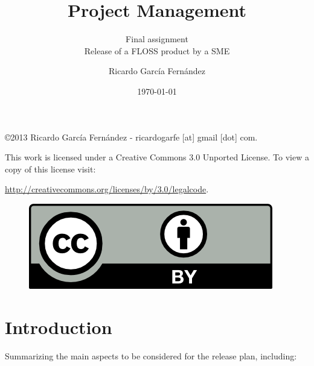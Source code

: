 \documentclass[11pt]{scrartcl}
\title{\textbf{Project Management}}
\subtitle{Final assignment\\
            Release of a FLOSS product by a SME}
\author{Ricardo Garc\'ia Fern\'andez}
\date{\today}
\begin{document}
\maketitle

\vfill

\begin{flushright}
    \copyright  2013 Ricardo Garc\'ia Fern\'andez - ricardogarfe [at] gmail [dot] com.

    This work is licensed under a Creative Commons 3.0 Unported License.
    To view a copy of this license visit:
 
    \url{http://creativecommons.org/licenses/by/3.0/legalcode}.
\end{flushright}

\begin{figure}[h]
    \begin{flushright}	
        \includegraphics{by}
        \label{fig:by}
    \end{flushright}
\end{figure}

\newpage

\section{Introduction}

Summarizing the main aspects to be considered for the release plan, including:
\end{document}
